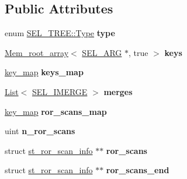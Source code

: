 \subsection*{Public Attributes}
\begin{DoxyCompactItemize}
\item 
\mbox{\label{classSEL__TREE_a2b7e001ea948e23bd525d5a9cac63df3}} 
enum \mbox{\hyperlink{classSEL__TREE_ab2c33faad20fa0700f23ed800de66cc8}{S\+E\+L\+\_\+\+T\+R\+E\+E\+::\+Type}} {\bfseries type}
\item 
\mbox{\label{classSEL__TREE_a0441b669d618c73331759c58a0f3645e}} 
\mbox{\hyperlink{classMem__root__array}{Mem\+\_\+root\+\_\+array}}$<$ \mbox{\hyperlink{classSEL__ARG}{S\+E\+L\+\_\+\+A\+RG}} $\ast$, true $>$ {\bfseries keys}
\item 
\mbox{\label{classSEL__TREE_a9526d7ab55b36e900bd3d60d27fddf62}} 
\mbox{\hyperlink{classBitmap_3_0164_01_4}{key\+\_\+map}} {\bfseries keys\+\_\+map}
\item 
\mbox{\label{classSEL__TREE_a8759ce501d0468dc336300b98ff28c25}} 
\mbox{\hyperlink{classList}{List}}$<$ \mbox{\hyperlink{classSEL__IMERGE}{S\+E\+L\+\_\+\+I\+M\+E\+R\+GE}} $>$ {\bfseries merges}
\item 
\mbox{\label{classSEL__TREE_afcf3db917112da2c29828bc64471b1d5}} 
\mbox{\hyperlink{classBitmap_3_0164_01_4}{key\+\_\+map}} {\bfseries ror\+\_\+scans\+\_\+map}
\item 
\mbox{\label{classSEL__TREE_a78326a7b358011f3eb7520599e89a806}} 
uint {\bfseries n\+\_\+ror\+\_\+scans}
\item 
\mbox{\label{classSEL__TREE_a66bfa1a41f70864e151bf2c3d7f6eb98}} 
struct \mbox{\hyperlink{structst__ror__scan__info}{st\+\_\+ror\+\_\+scan\+\_\+info}} $\ast$$\ast$ {\bfseries ror\+\_\+scans}
\item 
\mbox{\label{classSEL__TREE_a2178ec91d952754be7a8c29abada5aa8}} 
struct \mbox{\hyperlink{structst__ror__scan__info}{st\+\_\+ror\+\_\+scan\+\_\+info}} $\ast$$\ast$ {\bfseries ror\+\_\+scans\+\_\+end}
\end{DoxyCompactItemize}
